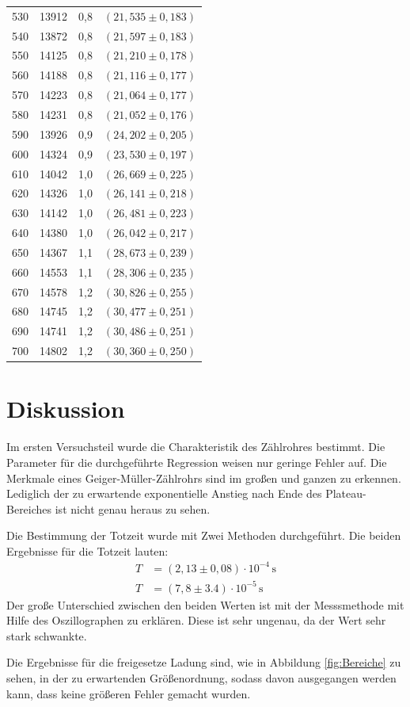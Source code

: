 \begin{table}
\begin{tabular}{c c c c }
530 & 13912 & 0,8 & $(21,535\pm 0,183)$ \\
540 & 13872 & 0,8 & $(21,597\pm 0,183)$ \\
550 & 14125 & 0,8 & $(21,210\pm 0,178)$ \\
560 & 14188 & 0,8 & $(21,116\pm 0,177)$ \\
570 & 14223 & 0,8 & $(21,064\pm 0,177)$ \\
580 & 14231 & 0,8 & $(21,052\pm 0,176)$ \\
590 & 13926 & 0,9 & $(24,202\pm 0,205)$ \\
600 & 14324 & 0,9 & $(23,530\pm 0,197)$ \\
610 & 14042 & 1,0 & $(26,669\pm 0,225)$ \\
620 & 14326 & 1,0 & $(26,141\pm 0,218)$ \\
630 & 14142 & 1,0 & $(26,481\pm 0,223)$ \\
640 & 14380 & 1,0 & $(26,042\pm 0,217)$ \\
650 & 14367 & 1,1 & $(28,673\pm 0,239)$ \\
660 & 14553 & 1,1 & $(28,306\pm 0,235)$ \\
670 & 14578 & 1,2 & $(30,826\pm 0,255)$ \\
680 & 14745 & 1,2 & $(30,477\pm 0,251)$  \\
690 & 14741 & 1,2 & $(30,486\pm 0,251)$ \\
700 & 14802 & 1,2 & $(30,360\pm 0,250)$ \\
\bottomrule
\end{tabular}
\end{table}

\section{Diskussion}
Im ersten Versuchsteil wurde die Charakteristik des Zählrohres bestimmt.
Die Parameter für die durchgeführte Regression weisen nur geringe Fehler auf.
Die Merkmale eines Geiger-Müller-Zählrohrs sind im großen und ganzen zu erkennen.
Lediglich der zu erwartende exponentielle Anstieg nach Ende des Plateau-Bereiches ist nicht genau heraus zu sehen.

Die Bestimmung der Totzeit wurde mit Zwei Methoden durchgeführt.
Die beiden Ergebnisse für die Totzeit lauten:
\begin{align*}
  T &= (2,13\pm0,08)\cdot 10^{-4}\,\mathrm{s}\\
  T &= (7,8\pm 3.4)\cdot 10^{-5} \, \mathrm{s}
\end{align*}
Der große Unterschied zwischen den beiden Werten ist mit der Messsmethode mit Hilfe des Oszillographen zu erklären.
Diese ist sehr ungenau, da der Wert sehr stark schwankte.

Die Ergebnisse für die freigesetze Ladung sind, wie in Abbildung \ref{fig:Bereiche} zu sehen, in der zu erwartenden Größenordnung,
sodass davon ausgegangen werden kann, dass keine größeren Fehler gemacht wurden.
